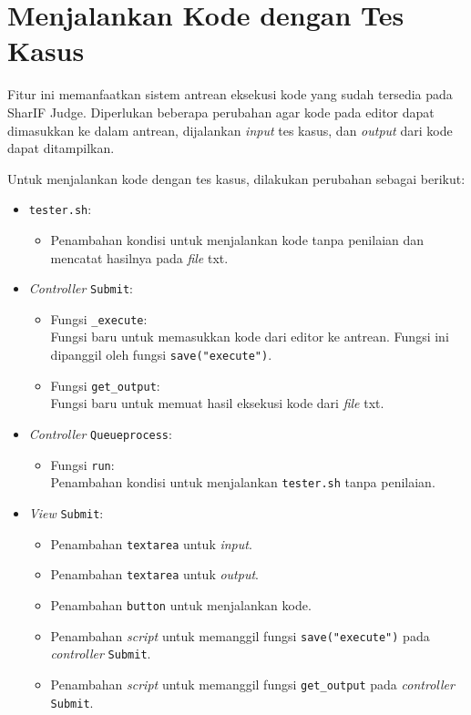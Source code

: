 \section{Menjalankan Kode dengan Tes Kasus}
\label{sec:4:jalan}

Fitur ini memanfaatkan sistem antrean eksekusi kode yang sudah tersedia pada SharIF Judge.
Diperlukan beberapa perubahan agar kode pada editor dapat dimasukkan ke dalam antrean, dijalankan \textit{input} tes kasus, dan \textit{output} dari kode dapat ditampilkan.

Untuk menjalankan kode dengan tes kasus, dilakukan perubahan sebagai berikut:
\begin{itemize}
	\item \verb|tester.sh|:
    \begin{itemize}
        \item Penambahan kondisi untuk menjalankan kode tanpa penilaian dan mencatat hasilnya pada \textit{file} txt.
    \end{itemize}
	\item \textit{Controller} \verb|Submit|:
    \begin{itemize}
        \item Fungsi \verb|_execute|: \\ Fungsi baru untuk memasukkan kode dari editor ke antrean. Fungsi ini dipanggil oleh fungsi \verb|save("execute")|.
        \item Fungsi \verb|get_output|: \\ Fungsi baru untuk memuat hasil eksekusi kode dari \textit{file} txt.
    \end{itemize}
	\item \textit{Controller} \verb|Queueprocess|:
    \begin{itemize}
        \item Fungsi \verb|run|: \\ Penambahan kondisi untuk menjalankan \verb|tester.sh| tanpa penilaian.
    \end{itemize}
    \item \textit{View} \verb|Submit|:
    \begin{itemize}
		\item Penambahan \verb|textarea| untuk \textit{input}.
		\item Penambahan \verb|textarea| untuk \textit{output}.
        \item Penambahan \verb|button| untuk menjalankan kode.
        \item Penambahan \textit{script} untuk memanggil fungsi \verb|save("execute")| pada \textit{controller} \verb|Submit|.
        \item Penambahan \textit{script} untuk memanggil fungsi \verb|get_output| pada \textit{controller} \verb|Submit|.
    \end{itemize}
\end{itemize}

